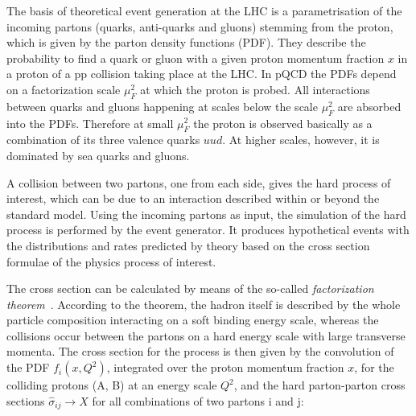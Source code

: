 The basis of theoretical event generation at the LHC is a parametrisation of the incoming partons (quarks, anti-quarks and gluons) stemming from the proton, which is given by the parton density functions (PDF).
They describe the probability to find a quark or gluon with a given proton momentum fraction $x$ in a proton of a pp collision taking place at the LHC.
In pQCD the PDFs depend on a factorization scale $\mu^2_F$ at which the proton is probed.
All interactions between quarks and gluons happening at scales below the scale $\mu^2_F$ are absorbed into the PDFs. Therefore at small $\mu^2_F$ the proton is observed basically as a combination of its
three valence quarks $uud$. At higher scales, however, it is dominated by sea quarks and gluons.

A collision between two partons, one from each side, gives the hard process of interest, which can be due to an interaction described within or beyond the standard model.
Using the incoming partons as input, the simulation of the hard process is performed by the event generator.
It produces hypothetical events with the distributions and rates predicted by theory based on the cross section formulae of the physics process of interest.

The cross section can be calculated by means of the so-called \textit{factorization theorem}~\cite{Collins:1987pm}.
According to the theorem, the hadron itself is described by the whole particle composition interacting on a soft binding energy scale,
whereas the collisions occur between the partons on a hard energy scale with large transverse momenta.
The cross section for the process is then given by the convolution of the PDF $f_i(x,Q^2)$, integrated over the proton momentum fraction $x$, for the colliding protons (A, B) at an energy scale $Q^2$,
and the hard parton-parton cross sections $\hat{\sigma}_{ij} \to X$ for all combinations of two partons i and j:

